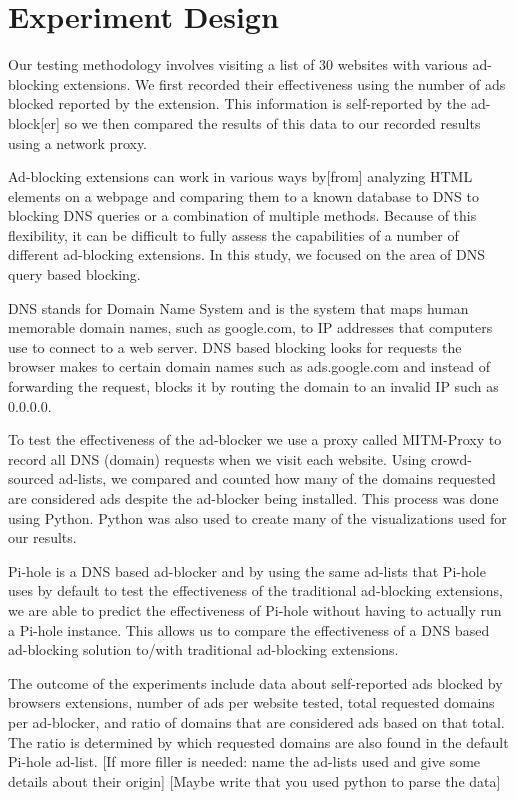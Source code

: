 \documentclass[sigsmall]{acmart}
\begin{document}
\section*{Experiment Design}\label{ED}
Our testing methodology involves visiting a list of 30 websites with various ad-blocking extensions. We first recorded their effectiveness using the number of ads blocked reported by the extension. This information is self-reported by the ad-block[er] so we then compared the results of this data to our recorded results using a network proxy.

Ad-blocking extensions can work in various ways by[from] analyzing HTML elements on a webpage and comparing them to a known database to DNS to blocking DNS queries or a combination of multiple methods. Because of this flexibility, it can be difficult to fully assess the capabilities of a number of different ad-blocking extensions. In this study, we focused on the area of DNS query based blocking.

DNS stands for Domain Name System and is the system that maps human memorable domain names, such as google.com, to IP addresses that computers use to connect to a web server. DNS based blocking looks for requests the browser makes to certain domain names such as ads.google.com and instead of forwarding the request, blocks it by routing the domain to an invalid IP such as 0.0.0.0.

To test the effectiveness of the ad-blocker we use a proxy called MITM-Proxy to record all DNS (domain) requests when we visit each website. Using crowd-sourced ad-lists, we compared and counted how many of the domains requested are considered ads despite the ad-blocker being installed. This process was done using Python. Python was also used to create many of the visualizations used for our results.

Pi-hole is a DNS based ad-blocker and by using the same ad-lists that Pi-hole uses by default to test the effectiveness of the traditional ad-blocking extensions, we are able to predict the effectiveness of Pi-hole without having to actually run a Pi-hole instance. This allows us to compare the effectiveness of a DNS based ad-blocking solution to/with traditional ad-blocking extensions.

The outcome of the experiments include data about self-reported ads blocked by browsers extensions, number of ads per website tested, total requested domains per ad-blocker, and ratio of domains that are considered ads based on that total. The ratio is determined by which requested domains are also found in the default Pi-hole ad-list.
[If more filler is needed: name the ad-lists used and give some details about their origin] [Maybe write that you used python to parse the data]
\end{document}
